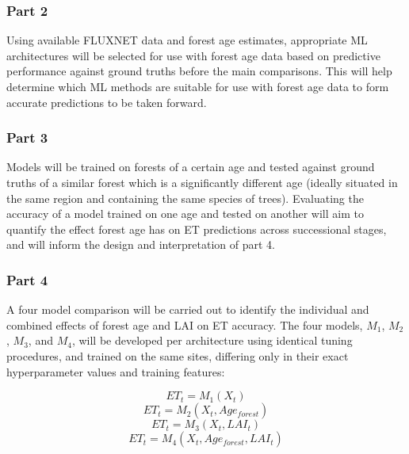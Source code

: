 \documentclass[paper=a4,fontsize=12pt]{scrartcl}
\begin{document}
\subsubsection*{Part 2}
Using available FLUXNET data and forest age estimates, appropriate ML architectures will be selected for use with forest age data based on predictive performance against ground truths before the main comparisons. This will help determine which ML methods are suitable for use with forest age data to form accurate predictions to be taken forward.


\subsubsection*{Part 3}
Models will be trained on forests of a certain age and tested against ground truths of a similar forest which is a significantly different age (ideally situated in the same region and containing the same species of trees). Evaluating the accuracy of a model trained on one age and tested on another will aim to quantify the effect forest age has on ET predictions across successional stages, and will inform the design and interpretation of part 4.


\subsubsection*{Part 4}
A four model comparison will be carried out to identify the individual and combined effects of forest age and LAI on ET accuracy. The four models, $M_1$, $M_2$, $M_3$, and $M_4$,  will be developed per architecture using identical tuning procedures, and trained on the same sites, differing only in their exact hyperparameter values and training features:

\vspace{-1em}
\begin{equation}
	ET_t = M_1\left(X_t\right)
	\label{eq:og}
\end{equation}
\begin{equation}
	ET_t = M_2(X_t, Age_{\textit{forest}})
	\label{eq:mine2}
\end{equation}
\begin{equation}
	ET_t = M_3(X_t, LAI_t)
	\label{eq:mine}
\end{equation}
\begin{equation}
	ET_t = M_4(X_t, Age_{\textit{forest}}, LAI_t)
	\label{eq:mine3}
\end{equation}
\end{document}
